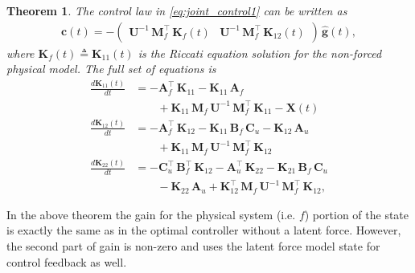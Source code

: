 \documentclass[journal]{IEEEtran}
\newtheorem{theorem}{Theorem}[section]
\begin{document}
\begin{theorem} \label{the:control1}
The control law in \eqref{eq:joint_control1} can be written as
%
\begin{equation} 
\begin{split}
  \mathbf{c}(t) = - \begin{pmatrix}
    \mathbf{U}^{-1} \, \mathbf{M}_f^{\top} \, \mathbf{K}_{f}(t) &
    \mathbf{U}^{-1} \, \mathbf{M}_f^{\top} \, \mathbf{K}_{12}(t)
  \end{pmatrix} \, \hat{\mathbf{g}}(t),
\end{split}
\label{eq:joint_control2}
\end{equation}
%
where $\mathbf{K}_{f}(t) \triangleq \mathbf{K}_{11}(t)$ is the Riccati equation solution for the non-forced physical model. The full set of equations is
%
\begin{equation}
\begin{split}
  \frac{d\mathbf{K}_{11}(t)}{dt}
  &= -\mathbf{A}_f^{\top} \, \mathbf{K}_{11} - \mathbf{K}_{11} \, \mathbf{A}_f
  \\
  &\qquad
  + \mathbf{K}_{11} \, \mathbf{M}_f \, \mathbf{U}^{-1} \, \mathbf{M}_f^{\top} \, \mathbf{K}_{11} - \mathbf{X}(t) \\
  \frac{d\mathbf{K}_{12}(t)}{dt}
  &= -\mathbf{A}_f^{\top} \, \mathbf{K}_{12} - \mathbf{K}_{11} \, \mathbf{B}_f \, \mathbf{C}_u - \mathbf{K}_{12} \, \mathbf{A}_u
  \\
  &\qquad + \mathbf{K}_{11} \, \mathbf{M}_f \, \mathbf{U}^{-1} \, \mathbf{M}_f^{\top} \, \mathbf{K}_{12} \\
  \frac{d\mathbf{K}_{22}(t)}{dt}
  &= -\mathbf{C}_u^{\top} \, \mathbf{B}_f^{\top} \, \mathbf{K}_{12} - \mathbf{A}_u^{\top} \, \mathbf{K}_{22}
  - \mathbf{K}_{21} \, \mathbf{B}_f \, \mathbf{C}_u \\
  &\qquad  - \mathbf{K}_{22} \, \mathbf{A}_u
  + \mathbf{K}_{12}^{\top} \, \mathbf{M}_f \, \mathbf{U}^{-1} \, \mathbf{M}_f^{\top} \, \mathbf{K}_{12},
\end{split}
\end{equation}
\end{theorem}
%
In the above theorem the gain for the physical system (i.e. $f$) portion of the state is exactly the same as in the optimal controller without a latent force. However, the second part of gain is non-zero and uses the latent force model state for control feedback as well.
\end{document}
